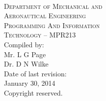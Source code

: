 \begin{titlepage}
    \thispagestyle{empty}
    \begin{center}
        \ \\
        \vspace{1.5cm}
        {\Large
            \textsc{Department of Mechanical and} \\
            \vspace{0.2cm}
            \textsc{Aeronautical Engineering}} \\
        \vspace{1.2cm}
        {\huge
            \textsc{Programming And Information} \\
            \vspace{0.4em}
            \textsc{Technology -- MPR213}} \\
        \vspace{2.0cm}
        {\large Compiled by:} \\
        \vspace{0.2cm}
        {\large Mr. L G Page} \\
        {\large Dr. D N Wilke} \\
        \vspace{1cm}
        {\large Date of last revision:} \\
        \vspace{0.2cm}
        {\large January 30, 2014} \\
        \vspace{1cm}
        {\large Copyright reserved.} \\
    \end{center}
\end{titlepage}
